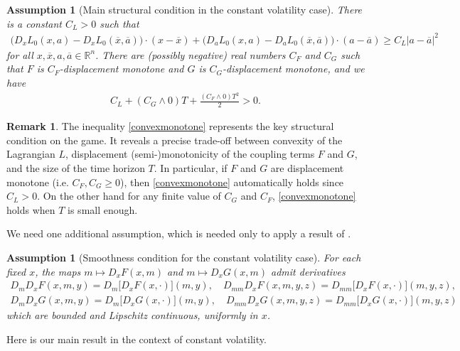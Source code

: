 \documentclass[11pt,reqno]{amsart}
\numberwithin{equation}{section}
\newtheorem{assumption}[theorem]{Assumption}
\theoremstyle{definition}
\newtheorem{remark}[theorem]{Remark}
\def\R{{\mathbb R}}
\newcommand{\ov}{\overline}
\def \R{\mathbb{R}}
\begin{document}
\begin{assumption}[Main structural condition in the constant volatility case] \label{assump:driftcontrolstruct}
There is a constant $C_L > 0$ such that
\begin{align} \label{jointconvex}
\big(D_x L_0(x,a) - D_x L_0(\ov{x},\ov{a})\big)\cdot(x - \ov{x}) + \big(D_a L_0(x,a) - D_a L_0(\ov{x},\ov{a})\big)\cdot(a - \ov{a}) \geq C_L |a - \ov{a}|^2
\end{align}
for all $x,\ov{x},a,\ov{a} \in \R^n$. 
There are (possibly negative) real numbers $C_{F}$ and $C_{G}$ such that $F$ is $ C_{F}$-displacement monotone and $G$ is $ C_{G}$-displacement monotone, and we have
\begin{align} \label{convexmonotone}
  C_L + (C_{G} \wedge 0) T + \frac{(C_{F} \wedge 0) T^2}{2}  > 0.
\end{align} 
\end{assumption}

\begin{remark}
The inequality \eqref{convexmonotone} represents the key structural condition on the game. It reveals a precise trade-off between convexity of the Lagrangian $L$, displacement (semi-)monotonicity of the coupling terms $F$ and $G$, and the size of the time horizon $T$. In particular, if $F$ and $G$ are displacement monotone (i.e. $C_F, C_G \geq 0$), then \eqref{convexmonotone} automatically holds since $C_L > 0$. On the other hand for any finite value of $C_G$ and $C_F$, \eqref{convexmonotone} holds when $T$ is small enough. 
\end{remark}

We need one additional assumption, which is needed only to apply a result of \cite{CST}.

\begin{assumption}[Smoothness condition for the constant volatility case] \label{assump:cstconstvol}
For each fixed $x$, the maps $m \mapsto D_x  F(x,m)$ and $m \mapsto D_x G(x,m)$ admit derivatives 
\begin{align*}
D_m D_x F(x,m,y) = D_m\big[D_x F(x,\cdot)](m,y), \quad D_{mm} D_x F(x,m,y,z) = D_{mm} \big[D_x F(x,\cdot)\big](m,y,z), \\
D_m D_x G(x,m,y) = D_m\big[D_x G(x,\cdot)](m,y), \quad D_{mm} D_x G(x,m,y,z) = D_{mm} \big[D_x G(x,\cdot)\big](m,y,z)
\end{align*}
which are bounded and Lipschitz continuous, uniformly in $x$.
\end{assumption}

Here is our main result in the context of constant volatility.
\end{document}
